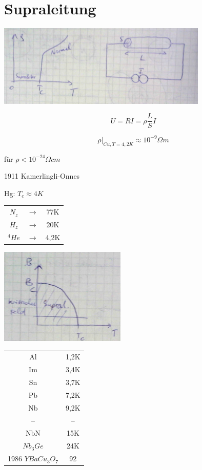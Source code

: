 \chapter{Supraleitung}

\includegraphics[width=0.75\textwidth]{kap13_01.png}

\[U=RI = \rho\frac{L}{S}I\]

\[\left.\rho\right|_{Cu,T=4,2K}\approx 10^{-9}\Omega m\]

für \(\rho < 10^{-24}\Omega cm\)

1911 Kamerlingli-Onnes

Hg: \(T_c\approx 4K\)

\begin{tabular}{ccc}
  \(N_z\)&\(\rightarrow \)&77K\\
  \(H_z\)&\(\rightarrow \)&20K\\
  \(^4He\)&\(\rightarrow \)&4,2K\\
\end{tabular}

\includegraphics[width=0.45\textwidth]{kap13_02.png}

\begin{tabular}{cc}
  Al&1,2K\\
Im&3,4K\\
Sn&3,7K\\
Pb&7,2K\\
Nb&9,2K\\
--&--\\
NbN&15K\\
\(Nb_3Ge\)&24K\\
1986 \(YBaCu_3O_7\) & 92
\end{tabular}

